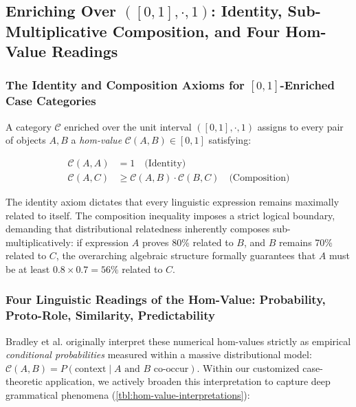 \documentclass[
]{article}
\begin{document}
\subsection{\texorpdfstring{Enriching Over \(([0,1],\cdot,1)\):
Identity, Sub-Multiplicative Composition, and Four Hom-Value
Readings}{Enriching Over ({[}0,1{]},\textbackslash cdot,1): Identity, Sub-Multiplicative Composition, and Four Hom-Value Readings}}\label{enriching-over-01cdot1-identity-sub-multiplicative-composition-and-four-hom-value-readings}

\subsubsection{\texorpdfstring{The Identity and Composition Axioms for
\([0,1]\)-Enriched Case
Categories}{The Identity and Composition Axioms for {[}0,1{]}-Enriched Case Categories}}\label{the-identity-and-composition-axioms-for-01-enriched-case-categories}

A category \(\mathcal{C}\) enriched over the unit interval
\(([0,1], \cdot, 1)\) assigns to every pair of objects \(A, B\) a
\emph{hom-value} \(\mathcal{C}(A, B) \in [0,1]\) satisfying:

\begin{align}
\mathcal{C}(A, A) &= 1 \quad \text{(Identity)} \label{eq:eq-5-1} \\
\mathcal{C}(A, C) &\geq \mathcal{C}(A, B) \cdot \mathcal{C}(B, C) \quad \text{(Composition)} \label{eq:eq-5-2}
\end{align}

The identity axiom dictates that every linguistic expression remains
maximally related to itself. The composition inequality imposes a strict
logical boundary, demanding that distributional relatedness inherently
composes sub-multiplicatively: if expression \(A\) proves 80\% related
to \(B\), and \(B\) remains 70\% related to \(C\), the overarching
algebraic structure formally guarantees that \(A\) must be at least
\(0.8 \times 0.7 = 56\%\) related to \(C\).

\subsubsection{Four Linguistic Readings of the Hom-Value: Probability,
Proto-Role, Similarity,
Predictability}\label{four-linguistic-readings-of-the-hom-value-probability-proto-role-similarity-predictability}

Bradley et al. \citeyearpar{fritz2021enriched} originally interpret
these numerical hom-values strictly as empirical \emph{conditional
probabilities} measured within a massive distributional model:
\(\mathcal{C}(A, B) = P(\text{context} \mid A \text{ and } B \text{ co-occur})\).
Within our customized case-theoretic application, we actively broaden
this interpretation to capture deep grammatical phenomena
(\autoref{tbl:hom-value-interpretations}):
\end{document}
